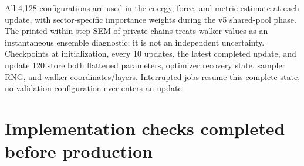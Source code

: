 All 4,128 configurations are used in the energy, force, and metric estimate at each
update, with sector-specific importance weights during the v5 shared-pool phase.
The printed within-step SEM of private chains treats walker values as an instantaneous
ensemble diagnostic; it is not an independent uncertainty. Checkpoints
at initialization, every 10 updates, the latest completed update, and update
120 store both flattened parameters, optimizer recovery state, sampler RNG,
and walker coordinates/layers. Interrupted jobs resume this complete state;
no validation configuration ever enters an update.

\section{Implementation checks completed before production}


